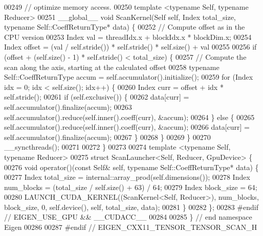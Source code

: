 \begin{DoxyCode}
00249 \textcolor{comment}{// optimize memory access.}
00250 \textcolor{keyword}{template} <\textcolor{keyword}{typename} Self, \textcolor{keyword}{typename} Reducer>
00251 \_\_global\_\_ \textcolor{keywordtype}{void} ScanKernel(Self \textcolor{keyword}{self}, Index total\_size, \textcolor{keyword}{typename} Self::CoeffReturnType* data) \{
00252   \textcolor{comment}{// Compute offset as in the CPU version}
00253   Index val = threadIdx.x + blockIdx.x * blockDim.x;
00254   Index offset = (val / \textcolor{keyword}{self}.stride()) * \textcolor{keyword}{self}.stride() * \textcolor{keyword}{self}.size() + val %
00255 
00256   \textcolor{keywordflow}{if} (offset + (\textcolor{keyword}{self}.size() - 1) * \textcolor{keyword}{self}.stride() < total\_size) \{
00257     \textcolor{comment}{// Compute the scan along the axis, starting at the calculated offset}
00258     \textcolor{keyword}{typename} Self::CoeffReturnType accum = \textcolor{keyword}{self}.accumulator().initialize();
00259     \textcolor{keywordflow}{for} (Index idx = 0; idx < \textcolor{keyword}{self}.size(); idx++) \{
00260       Index curr = offset + idx * \textcolor{keyword}{self}.stride();
00261       \textcolor{keywordflow}{if} (\textcolor{keyword}{self}.exclusive()) \{
00262         data[curr] = \textcolor{keyword}{self}.accumulator().finalize(accum);
00263         \textcolor{keyword}{self}.accumulator().reduce(\textcolor{keyword}{self}.inner().coeff(curr), &accum);
00264       \} \textcolor{keywordflow}{else} \{
00265         \textcolor{keyword}{self}.accumulator().reduce(\textcolor{keyword}{self}.inner().coeff(curr), &accum);
00266         data[curr] = \textcolor{keyword}{self}.accumulator().finalize(accum);
00267       \}
00268     \}
00269   \}
00270   \_\_syncthreads();
00271 
00272 \}
00273 
00274 \textcolor{keyword}{template} <\textcolor{keyword}{typename} Self, \textcolor{keyword}{typename} Reducer>
00275 \textcolor{keyword}{struct }ScanLauncher<Self, Reducer, GpuDevice> \{
00276   \textcolor{keywordtype}{void} operator()(\textcolor{keyword}{const} Self& \textcolor{keyword}{self}, \textcolor{keyword}{typename} Self::CoeffReturnType* data) \{
00277      Index total\_size = internal::array\_prod(\textcolor{keyword}{self}.dimensions());
00278      Index num\_blocks = (total\_size / \textcolor{keyword}{self}.size() + 63) / 64;
00279      Index block\_size = 64;
00280      LAUNCH\_CUDA\_KERNEL((ScanKernel<Self, Reducer>), num\_blocks, block\_size, 0, \textcolor{keyword}{self}.device(), \textcolor{keyword}{self}, 
      total\_size, data);
00281   \}
00282 \};
00283 \textcolor{preprocessor}{#endif  // EIGEN\_USE\_GPU && \_\_CUDACC\_\_}
00284 
00285 \}  \textcolor{comment}{// end namespace Eigen}
00286 
00287 \textcolor{preprocessor}{#endif  // EIGEN\_CXX11\_TENSOR\_TENSOR\_SCAN\_H}
\end{DoxyCode}

